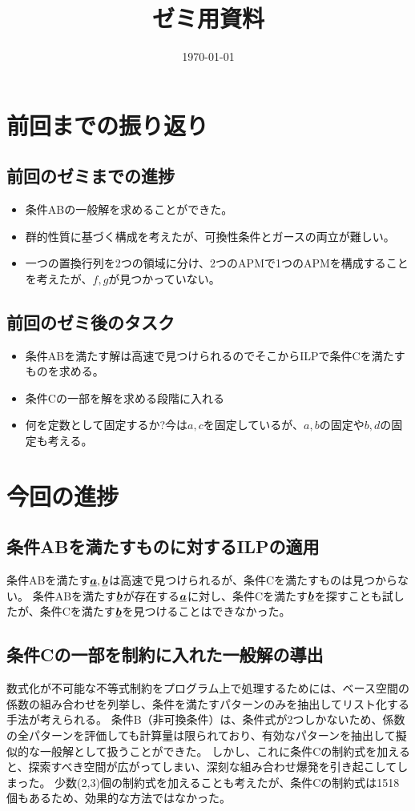 \documentclass[a4paper,11pt,dvipdfmx]{jsarticle}
\theoremstyle{definition}
\begin{document}
\title{ゼミ用資料}
\author{}
\date{\today}
\maketitle

\section{前回までの振り返り}
\subsection{前回のゼミまでの進捗}
\begin{itemize}
  \item 条件ABの一般解を求めることができた。
  \item 群的性質に基づく構成を考えたが、可換性条件とガースの両立が難しい。
  \item 一つの置換行列を2つの領域に分け、2つのAPMで1つのAPMを構成することを考えたが、$f,g$が見つかっていない。
\end{itemize}

\subsection{前回のゼミ後のタスク}
\begin{itemize}
  \item 条件ABを満たす解は高速で見つけられるのでそこからILPで条件Cを満たすものを求める。
  \item 条件Cの一部を解を求める段階に入れる
  \item 何を定数として固定するか?今は$a,c$を固定しているが、$a,b$の固定や$b,d$の固定も考える。
\end{itemize}

\section{今回の進捗}

\subsection{条件ABを満たすものに対するILPの適用}
条件ABを満たす$\underline{\bm{a}}, \underline{\bm{b}}$は高速で見つけられるが、条件Cを満たすものは見つからない。
条件ABを満たす$\underline{\bm{b}}$が存在する$\underline{\bm{a}}$に対し、条件Cを満たす$\underline{\bm{b}}$を探すことも試したが、条件Cを満たす$\underline{\bm{b}}$を見つけることはできなかった。

\subsection{条件Cの一部を制約に入れた一般解の導出}
数式化が不可能な不等式制約をプログラム上で処理するためには、ベース空間の係数の組み合わせを列挙し、条件を満たすパターンのみを抽出してリスト化する手法が考えられる。
条件B（非可換条件）は、条件式が2つしかないため、係数の全パターンを評価しても計算量は限られており、有効なパターンを抽出して擬似的な一般解として扱うことができた。
しかし、これに条件Cの制約式を加えると、探索すべき空間が広がってしまい、深刻な組み合わせ爆発を引き起こしてしまった。
少数(2,3)個の制約式を加えることも考えたが、条件Cの制約式は1518個もあるため、効果的な方法ではなかった。
\end{document}
